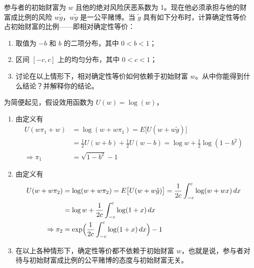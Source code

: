 \begin{problem}
 参与者的初始财富为 $w$ 且他的绝对风险厌恶系数为 1。现在他必须承担与他的财富成比例的风险 $w\tilde{g}$，$w\tilde{g}$ 是一公平赌博。当 $\tilde{g}$ 具有如下分布时，计算确定性等价占初始财富的比例——即相对确定性等价：
\begin{enumerate}[label=(\alph*)]
    \item 取值为 $-b$ 和 $b$ 的二项分布，其中 $0<b<1$；
    \item 区间 $[-c,c]$ 上的均匀分布，其中 $0<c<1$；
    \item 讨论在以上情形下，相对确定性等价如何依赖于初始财富 $w$。从中你能得到什么结论？并解释你的结论。
\end{enumerate}
\end{problem}
\begin{solution}
为简便起见，假设效用函数为 $U(w)=\log(w)$，
\begin{enumerate}[label=(\alph*)]
    \item 由定义有
    \[
        \begin{aligned}
            U(w\pi_{1}+w)&=\log(w+w\pi_{1})=E\bigl[U(w+w\tilde{g})\bigr]\\
            &=\tfrac12 U(w+b)+\tfrac12 U(w-b)=\log w+\tfrac12\log(1-b^{2})\\
            \Rightarrow\pi_{1}&=\sqrt{1-b^{2}}-1
        \end{aligned}
    \]

    \item 由定义有
    \[
        \begin{aligned}
            U(w+w\pi_{2})
            &=\log(w+w\pi_{2})=E\bigl[U(w+w\tilde{g})\bigr]=\frac{1}{2c}\int_{-c}^{c}\log(w+wx)\,dx\\
            &=\log w+\frac{1}{2c}\int_{-c}^{c}\log(1+x)\,dx\\
            \Rightarrow\pi_{2}&=\exp\Bigl(\frac{1}{2c}\int_{-c}^{c}\log(1+x)\,dx\Bigr)-1
        \end{aligned}
    \]

    \item 在以上各种情形下，确定性等价都不依赖于初始财富 $w$，也就是说，参与者对待与初始财富成比例的公平赌博的态度与初始财富无关。
\end{enumerate}
\end{solution}

